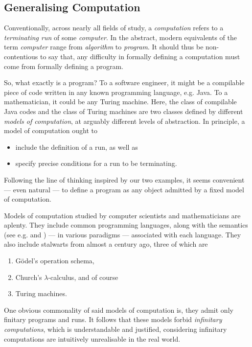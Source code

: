 \documentclass[12pt]{article}
\numberwithin{equation}{section}
\begin{document}
\subsection{Generalising Computation}

Conventionally, across nearly all fields of study, a \textit{computation} refers to a \textit{terminating run} of some \textit{computer}. In the abstract, modern equivalents of the term \textit{computer} range from \textit{algorithm} to \textit{program}. It should thus be non-contentious to say that, any difficulty in formally defining a computation must come from formally defining a program.

So, what exactly is a program? To a software engineer, it might be a compilable piece of code written in any known programming language, e.g. Java. To a mathematician, it could be any Turing machine. Here, the class of compilable Java codes and the class of Turing machines are two classes defined by different \textit{models of computation}, at arguably different levels of abstraction. In principle, a model of computation ought to 
\begin{itemize}
    \item include the definition of a run, as well as
    \item specify precise conditions for a run to be terminating.
\end{itemize} 
Following the line of thinking inspired by our two examples, it seems convenient --- even natural --- to define a program as any object admitted by a fixed model of computation. 

Models of computation studied by computer scientists and mathematicians are aplenty. They include common programming languages, along with the semantics (see e.g.\cite{scott} and \cite{meyer}) --- in various paradigms --- associated with each language. They also include stalwarts from almost a century ago, three of which are
\begin{enumerate}[leftmargin=40pt, label=(CT\arabic*)]
    \item\label{ct1} G\"{o}del's operation schema,
    \item Church's $\lambda$-calculus, and of course
    \item\label{ct3} Turing machines.
\end{enumerate}
One obvious commonality of said models of computation is, they admit only finitary programs and runs. It follows that these models forbid \textit{infinitary computations}, which is understandable and justified, considering infinitary computations are intuitively unrealisable in the real world. 
\end{document}
